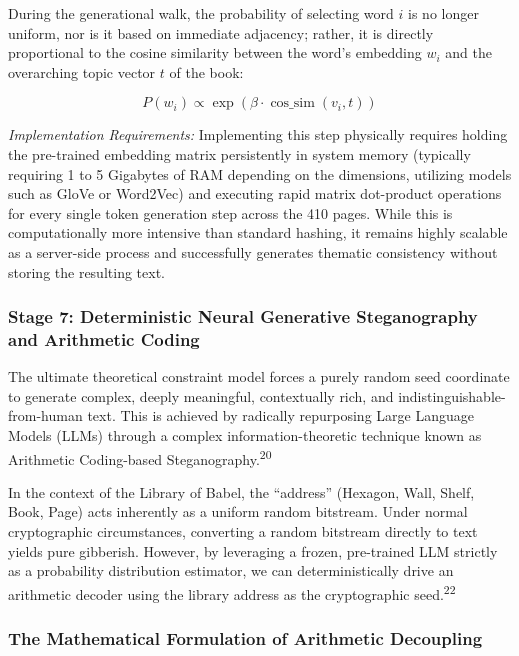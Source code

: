 \documentclass[
  11pt,
  a4paper,
]{article}
\begin{document}
During the generational walk, the probability of selecting word \(i\) is no longer uniform, nor is it based on immediate adjacency; rather, it is directly proportional to the cosine similarity between the word's embedding \(w_i\) and the overarching topic vector \(t\) of the book:

\[
P(w_i) \propto \exp(\beta \cdot \operatorname{cos\_sim}(v_i,t))
\]

\emph{Implementation Requirements:} Implementing this step physically requires holding the pre-trained embedding matrix persistently in system memory (typically requiring 1 to 5 Gigabytes of RAM depending on the dimensions, utilizing models such as GloVe or Word2Vec) and executing rapid matrix dot-product operations for every single token generation step across the 410 pages. While this is computationally more intensive than standard hashing, it remains highly scalable as a server-side process and successfully generates thematic consistency without storing the resulting text.

\subsubsection{Stage 7: Deterministic Neural Generative Steganography and Arithmetic Coding}\label{stage-7-deterministic-neural-generative-steganography-and-arithmetic-coding}

The ultimate theoretical constraint model forces a purely random seed coordinate to generate complex, deeply meaningful, contextually rich, and indistinguishable-from-human text. This is achieved by radically repurposing Large Language Models (LLMs) through a complex information-theoretic technique known as Arithmetic Coding-based Steganography.\textsuperscript{20}

In the context of the Library of Babel, the ``address'' (Hexagon, Wall, Shelf, Book, Page) acts inherently as a uniform random bitstream. Under normal cryptographic circumstances, converting a random bitstream directly to text yields pure gibberish. However, by leveraging a frozen, pre-trained LLM strictly as a probability distribution estimator, we can deterministically drive an arithmetic decoder using the library address as the cryptographic seed.\textsuperscript{22}

\subsubsection{The Mathematical Formulation of Arithmetic Decoupling}\label{the-mathematical-formulation-of-arithmetic-decoupling}
\end{document}

